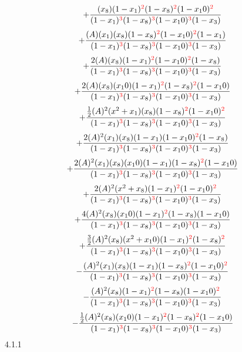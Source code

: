 \documentclass{article}
\begin{document}
\[+\frac{(x_8)(1-x_1)^{\textcolor{red}{2}}(1-x_8)^{\textcolor{red}{2}}(1-x_10)^{\textcolor{red}{2}}}{(1-x_1)^{\textcolor{red}{3}}(1-x_8)^{\textcolor{red}{3}}(1-x_10)^{\textcolor{red}{3}}(1-x_3)}\]\[+\frac{(A)(x_1)(x_8)(1-x_8)^{\textcolor{red}{2}}(1-x_10)^{\textcolor{red}{2}}(1-x_1)}{(1-x_1)^{\textcolor{red}{3}}(1-x_8)^{\textcolor{red}{3}}(1-x_10)^{\textcolor{red}{3}}(1-x_3)}\]\[+\frac{2(A)(x_8)(1-x_1)^{\textcolor{red}{2}}(1-x_10)^{\textcolor{red}{2}}(1-x_8)}{(1-x_1)^{\textcolor{red}{3}}(1-x_8)^{\textcolor{red}{3}}(1-x_10)^{\textcolor{red}{3}}(1-x_3)}\]\[+\frac{2(A)(x_8)(x_10)(1-x_1)^{\textcolor{red}{2}}(1-x_8)^{\textcolor{red}{2}}(1-x_10)}{(1-x_1)^{\textcolor{red}{3}}(1-x_8)^{\textcolor{red}{3}}(1-x_10)^{\textcolor{red}{3}}(1-x_3)}\]\[+\frac{\frac{1}{2}(A)^{2}(x^{2}+x_1)(x_8)(1-x_8)^{\textcolor{red}{2}}(1-x_10)^{\textcolor{red}{2}}}{(1-x_1)^{\textcolor{red}{3}}(1-x_8)^{\textcolor{red}{3}}(1-x_10)^{\textcolor{red}{3}}(1-x_3)}\]\[+\frac{2(A)^{2}(x_1)(x_8)(1-x_1)(1-x_10)^{\textcolor{red}{2}}(1-x_8)}{(1-x_1)^{\textcolor{red}{3}}(1-x_8)^{\textcolor{red}{3}}(1-x_10)^{\textcolor{red}{3}}(1-x_3)}\]\[+\frac{2(A)^{2}(x_1)(x_8)(x_10)(1-x_1)(1-x_8)^{\textcolor{red}{2}}(1-x_10)}{(1-x_1)^{\textcolor{red}{3}}(1-x_8)^{\textcolor{red}{3}}(1-x_10)^{\textcolor{red}{3}}(1-x_3)}\]\[+\frac{2(A)^{2}(x^{2}+x_8)(1-x_1)^{\textcolor{red}{2}}(1-x_10)^{\textcolor{red}{2}}}{(1-x_1)^{\textcolor{red}{3}}(1-x_8)^{\textcolor{red}{3}}(1-x_10)^{\textcolor{red}{3}}(1-x_3)}\]\[+\frac{4(A)^{2}(x_8)(x_10)(1-x_1)^{\textcolor{red}{2}}(1-x_8)(1-x_10)}{(1-x_1)^{\textcolor{red}{3}}(1-x_8)^{\textcolor{red}{3}}(1-x_10)^{\textcolor{red}{3}}(1-x_3)}\]\[+\frac{\frac{3}{2}(A)^{2}(x_8)(x^{2}+x_10)(1-x_1)^{\textcolor{red}{2}}(1-x_8)^{\textcolor{red}{2}}}{(1-x_1)^{\textcolor{red}{3}}(1-x_8)^{\textcolor{red}{3}}(1-x_10)^{\textcolor{red}{3}}(1-x_3)}\]\[-\frac{(A)^{2}(x_1)(x_8)(1-x_1)(1-x_8)^{\textcolor{red}{2}}(1-x_10)^{\textcolor{red}{2}}}{(1-x_1)^{\textcolor{red}{3}}(1-x_8)^{\textcolor{red}{3}}(1-x_10)^{\textcolor{red}{3}}(1-x_3)}\]\[-\frac{(A)^{2}(x_8)(1-x_1)^{\textcolor{red}{2}}(1-x_8)(1-x_10)^{\textcolor{red}{2}}}{(1-x_1)^{\textcolor{red}{3}}(1-x_8)^{\textcolor{red}{3}}(1-x_10)^{\textcolor{red}{3}}(1-x_3)}\]\[-\frac{\frac{1}{2}(A)^{2}(x_8)(x_10)(1-x_1)^{\textcolor{red}{2}}(1-x_8)^{\textcolor{red}{2}}(1-x_10)}{(1-x_1)^{\textcolor{red}{3}}(1-x_8)^{\textcolor{red}{3}}(1-x_10)^{\textcolor{red}{3}}(1-x_3)}\]
4.1.1
\end{document}
